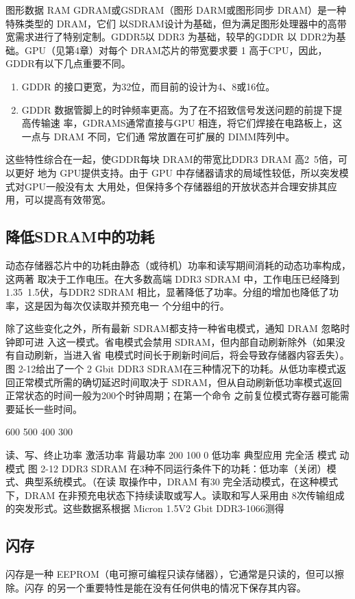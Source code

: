 图形数据 RAM
GDRAM或GSDRAM（图形 DARM或图形同步 DRAM）是一种特殊类型的 DRAM，它们
以SDRAM设计为基础，但为满足图形处理器中的高带宽需求进行了特别定制。GDDR5以 DDR3
为基础，较早的GDDR 以 DDR2为基础。GPU（见第4章）对每个 DRAM芯片的带宽要求要
1
高于CPU，因此，GDDR有以下几点重要不同。

\begin{enumerate}
    \item GDDR 的接口更宽，为32位，而目前的设计为4、8或16位。
    \item GDDR 数据管脚上的时钟频率更高。为了在不招致信号发送问题的前提下提高传输速
    率，GDRAMS通常直接与GPU 相连，将它们焊接在电路板上，这一点与 DRAM 不同，它们通
    常放置在可扩展的 DIMM阵列中。
\end{enumerate}

这些特性综合在一起，使GDDR每块 DRAM的带宽比DDR3 DRAM 高2~5倍，可以更好
地为 GPU提供支持。由于 GPU 中存储器请求的局域性较低，所以突发模式对GPU一般没有太
大用处，但保持多个存储器组的开放状态并合理安排其应用，可以提高有效带宽。

\subsection{降低SDRAM中的功耗}
动态存储器芯片中的功耗由静态（或待机）功率和读写期间消耗的动态功率构成，这两著
取决于工作电压。在大多数高端 DDR3 SDRAM 中，工作电压已经降到1.35~1.5伏，与DDR2
SDRAM 相比，显著降低了功率。分组的增加也降低了功率，这是因为每次仅读取并预充电一
个分组中的行。

除了这些变化之外，所有最新 SDRAM都支持一种省电模式，通知 DRAM 忽略时钟即可进
入这一模式。省电模式会禁用 SDRAM，但内部自动刷新除外（如果没有自动刷新，当进入省
电模式时间长于刷新时间后，将会导致存储器内容丢失）。图 2-12给出了一个 2 Gbit DDR3
SDRAM在三种情况下的功耗。从低功率模式返回正常模式所需的确切延迟时间取决于
SDRAM，但从自动刷新低功率模式返回正常状态的时间一般为200个时钟周期；在第一个命令
之前复位模式寄存器可能需要延长一些时间。

600
500
400
300

读、写、终止功率
激活功率
背最功率
200
100
0
低功率
典型应用
完全活
模式
动模式
图 2-12 DDR3 SDRAM 在3种不同运行条件下的功耗：低功率（关闭）模式、典型系统模式。（在读
取操作中，DRAM 有30%
完全活动模式，在这种模式下，DRAM 在非预充电状态下持续读取或写人。读取和写人采用由
8次传输组成的突发形式。这些数据系根据 Micron 1.5V2 Gbit DDR3-1066测得
\subsection{闪存}
闪存是一种 EEPROM（电可擦可编程只读存储器），它通常是只读的，但可以擦除。闪存
的另一个重要特性是能在没有任何供电的情况下保存其内容。

